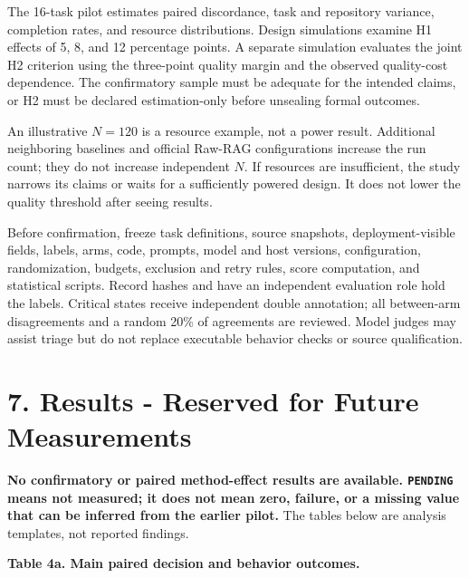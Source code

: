 \documentclass[
  11pt,
  a4paper,
]{article}
\begin{document}
The 16-task pilot estimates paired discordance, task and repository
variance, completion rates, and resource distributions. Design
simulations examine H1 effects of 5, 8, and 12 percentage points. A
separate simulation evaluates the joint H2 criterion using the
three-point quality margin and the observed quality-cost dependence. The
confirmatory sample must be adequate for the intended claims, or H2 must
be declared estimation-only before unsealing formal outcomes.

An illustrative \(N=120\) is a resource example, not a power result.
Additional neighboring baselines and official Raw-RAG configurations
increase the run count; they do not increase independent \(N\). If
resources are insufficient, the study narrows its claims or waits for a
sufficiently powered design. It does not lower the quality threshold
after seeing results.

Before confirmation, freeze task definitions, source snapshots,
deployment-visible fields, labels, arms, code, prompts, model and host
versions, configuration, randomization, budgets, exclusion and retry
rules, score computation, and statistical scripts. Record hashes and
have an independent evaluation role hold the labels. Critical states
receive independent double annotation; all between-arm disagreements and
a random 20\% of agreements are reviewed. Model judges may assist triage
but do not replace executable behavior checks or source qualification.

\section{7. Results - Reserved for Future
Measurements}\label{results---reserved-for-future-measurements}

\textbf{No confirmatory or paired method-effect results are available.
\texttt{PENDING} means not measured; it does not mean zero, failure, or
a missing value that can be inferred from the earlier pilot.} The tables
below are analysis templates, not reported findings.


\textbf{Table 4a. Main paired decision and behavior outcomes.}
\end{document}
